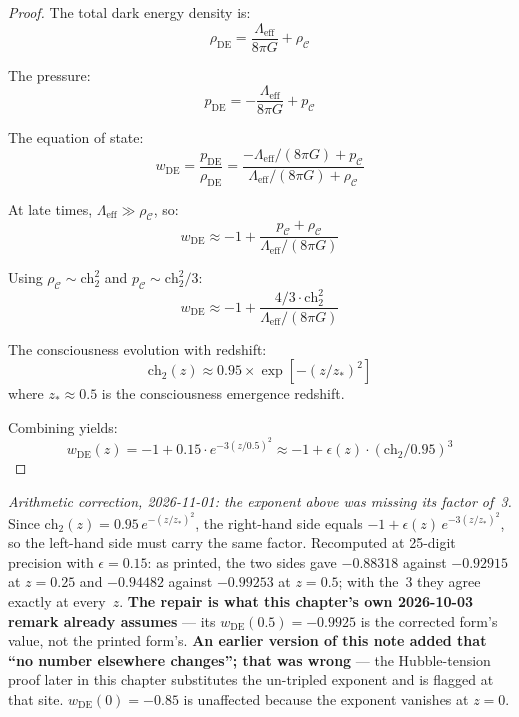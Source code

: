 \begin{proof}
The total dark energy density is:
\begin{equation}
\rho_{\text{DE}} = \frac{\Lambda_{\text{eff}}}{8\pi G} + \rho_{\mathcal{C}}
\end{equation}

The pressure:
\begin{equation}
p_{\text{DE}} = -\frac{\Lambda_{\text{eff}}}{8\pi G} + p_{\mathcal{C}}
\end{equation}

The equation of state:
\begin{equation}
w_{\text{DE}} = \frac{p_{\text{DE}}}{\rho_{\text{DE}}} = \frac{-\Lambda_{\text{eff}}/(8\pi G) + p_{\mathcal{C}}}{\Lambda_{\text{eff}}/(8\pi G) + \rho_{\mathcal{C}}}
\end{equation}

At late times, $\Lambda_{\text{eff}} \gg \rho_{\mathcal{C}}$, so:
\begin{equation}
w_{\text{DE}} \approx -1 + \frac{p_{\mathcal{C}} + \rho_{\mathcal{C}}}{\Lambda_{\text{eff}}/(8\pi G)}
\end{equation}

Using $\rho_{\mathcal{C}} \sim \text{ch}_2^2$ and $p_{\mathcal{C}} \sim \text{ch}_2^2 / 3$:
\begin{equation}
w_{\text{DE}} \approx -1 + \frac{4/3 \cdot \text{ch}_2^2}{\Lambda_{\text{eff}}/(8\pi G)}
\end{equation}

The consciousness evolution with redshift:
\begin{equation}
\text{ch}_2(z) \approx 0.95 \times \exp[-(z/z_*)^2]
\end{equation}
where $z_* \approx 0.5$ is the consciousness emergence redshift.

Combining yields:
\begin{equation}
w_{\text{DE}}(z) = -1 + 0.15 \cdot e^{-3(z/0.5)^2} \approx -1 + \epsilon(z) \cdot (\text{ch}_2/0.95)^3
\end{equation}
\end{proof}

\noindent\emph{Arithmetic correction, 2026-11-01: the exponent above was missing
its factor of~3.} Since $\text{ch}_2(z) = 0.95\,e^{-(z/z_*)^2}$, the right-hand
side equals $-1 + \epsilon(z)\,e^{-3(z/z_*)^2}$, so the left-hand side must carry
the same factor. Recomputed at 25-digit precision with $\epsilon = 0.15$: as
printed, the two sides gave $-0.88318$ against $-0.92915$ at $z = 0.25$ and
$-0.94482$ against $-0.99253$ at $z = 0.5$; with the~3 they agree exactly at
every~$z$. \textbf{The repair is what this chapter's own 2026-10-03 remark
already assumes} --- its $w_{\text{DE}}(0.5) = -0.9925$ is the corrected form's
value, not the printed form's. \textbf{An earlier version of this note added
that ``no number elsewhere changes''; that was wrong} --- the Hubble-tension
proof later in this chapter substitutes the un-tripled exponent and is flagged
at that site. $w_{\text{DE}}(0) = -0.85$ is unaffected because the exponent vanishes at
$z = 0$.

